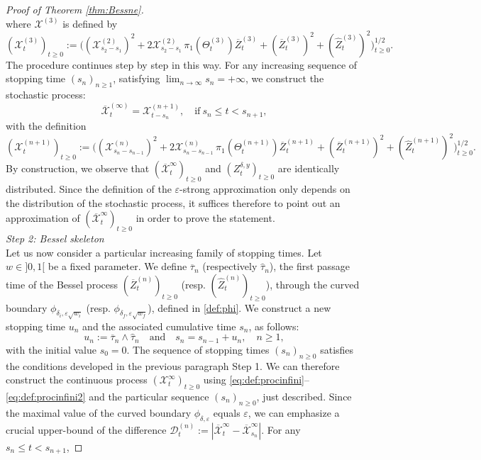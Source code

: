 \documentclass[12pt]{article}
\numberwithin{equation}{section}
\begin{document}
\begin{proof}[Proof of Theorem \ref{thm:Bessne}]
\[\]
where $\mathcal{X}^{(3)}$ is defined by 
\[
(\mathcal{X}_t^{(3)})_{t\ge 0}:=\Big( (\mathcal{X}^{(2)}_{s_2-s_1})^2+2\mathcal{X}^{(2)}_{s_2-s_1}\,\pi_1(\Theta_t^{(3)})\overline{Z}_t^{(3)} +(\overline{Z}_t^{(3)})^2 +(\widehat{Z}_t^{(3)})^2 \Big)^{1/2}_{t\ge 0}.
\]
The procedure continues step by step in this way. For any increasing sequence of stopping time $(s_n)_{n\ge 1}$, satisfying $\lim_{n\to\infty}s_n=+\infty$, we construct the stochastic process:
\begin{equation}
\label{eq:def:procinfini}
\overline{\mathcal{X}}_t^{(\infty)}=\mathcal{X}_{t-s_n}^{(n+1)},\quad \mbox{if}\ s_n\le t<s_{n+1},
\end{equation}
with the definition 
\begin{equation}\label{eq:def:procinfini2}
(\mathcal{X}_t^{(n+1)})_{t\ge 0}:=\Big( (\mathcal{X}^{(n)}_{s_n-s_{n-1}})^2+2\mathcal{X}^{(n)}_{s_n-s_{n-1}}\,\pi_1(\Theta_t^{(n+1)})\overline{Z}_t^{(n+1)} +(\overline{Z}_t^{(n+1)})^2 +(\widehat{Z}_t^{(n+1)})^2 \Big)^{1/2}_{t\ge 0}.
\end{equation}
By construction, we observe that $(\overline{\mathcal{X}}_t^{\infty})_{t\ge 0}$ and $(Z^{\delta,y}_t)_{t\ge 0}$ are identically distributed. Since the definition of the $\varepsilon$-strong approximation only depends on the distribution of the stochastic process, it suffices therefore to point out an approximation of $(\overline{\mathcal{X}}_t^{\infty})_{t\ge 0}$ in order to prove the statement.\\[5pt]
\noindent\emph{Step 2: Bessel skeleton}\\[5pt]
Let us now consider a particular increasing family of stopping times. Let $w\in]0,1[$ be a fixed parameter. We define $\overline{\tau}_n$ (respectively $\widehat{\tau}_n$), the first passage time of the Bessel process $(\overline{Z}_t^{(n)})_{t\ge 0}$ (resp. $(\widehat{Z}_t^{(n)})_{t\ge 0}$), through the curved boundary $\phi_{\delta_i,\varepsilon\sqrt{w_i}}$ (resp. $\phi_{\delta_f,\varepsilon\sqrt{w_f}}$), defined in \eqref{def:phi}. We construct a new stopping time $u_n$ and the associated cumulative time $s_n$, as follows:
\begin{equation}\label{defdeu}
u_n:=\overline{\tau}_n \wedge \widehat{\tau}_n\quad\mbox{and}\quad s_{n}=s_{n-1}+u_n,\quad n\ge 1,
\end{equation}
with the initial value $s_0=0$. The sequence of stopping times $(s_n)_{n\ge 0}$ satisfies the conditions developed in the previous paragraph Step 1. We can therefore construct the continuous process $(\mathcal{X}^\infty_t)_{t\ge 0}$ using \eqref{eq:def:procinfini}--\eqref{eq:def:procinfini2} and the particular sequence $(s_n)_{n\ge 0}$, just described. Since the maximal value of the curved boundary $\phi_{\delta,\varepsilon}$ equals $\varepsilon$, we can emphasize a crucial upper-bound of the difference  $\mathcal{D}^{(n)}_t:=|\overline{\mathcal{X}}^{\infty}_t-\overline{\mathcal{X}}^{\infty}_{s_n}|$. For any $s_n\le t<s_{n+1}$, 

\end{proof}
\end{document}
